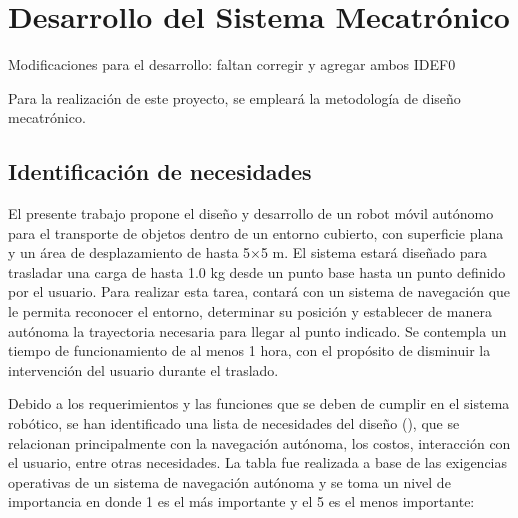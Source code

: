 
\chapter{Desarrollo del Sistema Mecatrónico}
\label{cap:desarrollo}


Modificaciones para el desarrollo:
faltan corregir y agregar ambos IDEF0



Para la realización de este proyecto, se empleará la metodología de diseño mecatrónico.

\section{Identificación de necesidades}
\label{sec:id-necesidades}

El presente trabajo propone el diseño y desarrollo de un robot móvil autónomo para el transporte de objetos dentro de un entorno cubierto, con superficie plana y un área de desplazamiento de hasta 5×5 m. El sistema estará diseñado para trasladar una carga de hasta 1.0 kg desde un punto base hasta un punto definido por el usuario. Para realizar esta tarea, contará con un sistema de navegación que le permita reconocer el entorno, determinar su posición y establecer de manera autónoma la trayectoria necesaria para llegar al punto indicado. Se contempla un tiempo de funcionamiento de al menos 1 hora, con el propósito de disminuir la intervención del usuario durante el traslado.

Debido a los requerimientos y las funciones que se deben de cumplir en el sistema robótico, se han identificado  una lista de necesidades del diseño (), que se relacionan principalmente con la navegación autónoma, los costos, interacción con el usuario, entre otras necesidades. La tabla fue realizada a base de las exigencias operativas de un sistema de navegación autónoma y se toma un nivel de importancia en donde 1 es el más importante y el 5 es el menos importante:

